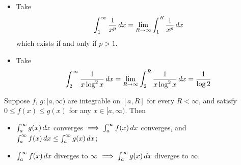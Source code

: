 \documentclass{../template/note}
\begin{document}
    \begin{example*}
        \begin{itemize}
            \item Take
            \begin{align*}
                \int_1^\infty \frac{1}{x^p} \,d{x} = \lim_{R \to \infty} \int_1^R \frac{1}{x^p} \,d{x}
            \end{align*}
            which exists if and only if \(p > 1\).
            \item Take
            \begin{align*}
                \int_2^\infty \frac{1}{x \log^2 x }\,d{x} = \lim_{R \to \infty} \int_2^R \frac{1}{x \log^2 x}\,d{x} = \frac 1{\log 2}
            \end{align*}
        \end{itemize}
    \end{example*}
    
    \begin{proposition}
        Suppose \(f\), \(g: [a, \infty)\) are integrable on \([a, R]\) for every \(R < \infty\), and satisfy \(0 \leq f(x) \leq g(x)\) for any \(x \in [a, \infty)\). Then
        \begin{itemize}
            \item \(\int_a^\infty g(x) \,d{x}\) converges \(\implies \int_a^\infty f(x) \,d{x}\) converges, and \(\int_a^\infty f(x) \,d{x} \leq \int_a^\infty g(x) \,d{x}\);
            \item \(\int_a^\infty f(x) \,d{x}\) diverges to \(\infty\) \(\implies \int_a^\infty g(x) \,d{x}\) diverges to \(\infty\).
        \end{itemize}
    \end{proposition}
    
\end{document}
